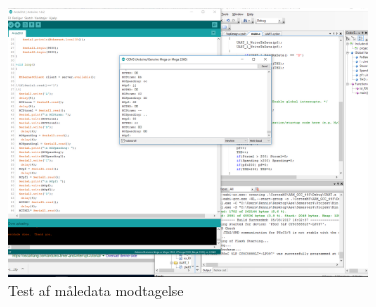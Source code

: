 \begin{figure}[H] %
	\centering
	\includegraphics[width=0.85\textwidth]{Test/ModultestStyringsenhed/EthernettestkontinuertDataflow}
	\caption{Test af måledata modtagelse}
	\label{fig:Hentmaaledata}
\end{figure}